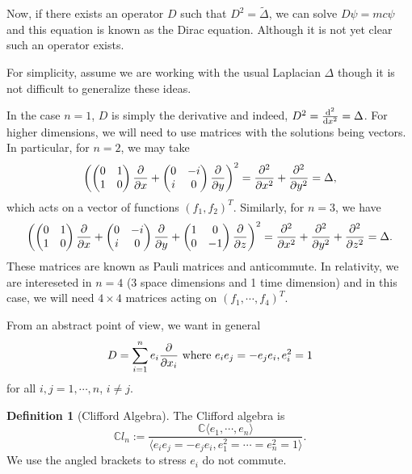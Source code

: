 \documentclass[]{article}
\theoremstyle{definition}
\theoremstyle{definition}
\newtheorem{definition}{Definition}[section]
\begin{document}
Now, if there exists an operator \(D\) such that \(D^2 = \tilde \Delta\), 
we can solve \(D\psi = mc \psi\) and this equation is known as the Dirac equation.
Although it is not yet clear such an operator exists.

For simplicity, assume we are working with the usual Laplacian \(\Delta\) though 
it is not difficult to generalize these ideas.

In the case \(n = 1\), \(D\) is simply the derivative and indeed, 
\(D^2 = \dv[2]{x} = \Delta\). For higher dimensions, we will need to use matrices 
with the solutions being vectors. In particular, for \(n = 2\), we may take 
\[\left(
  \begin{pmatrix}
    0 & 1 \\
    1 & 0
  \end{pmatrix}
  \pdv{x} +
  \begin{pmatrix}
    0 & -i \\
    i & 0
  \end{pmatrix}
  \pdv{y}
\right)^2 = 
  \pdv[2]{x} + \pdv[2]{y} = \Delta,\]
which acts on a vector of functions \((f_1, f_2)^T\). Similarly, 
for \(n = 3\), we have 
\[\left(
  \begin{pmatrix}
    0 & 1 \\
    1 & 0
  \end{pmatrix}
  \pdv{x} +
  \begin{pmatrix}
    0 & -i \\
    i & 0
  \end{pmatrix}
  \pdv{y} + 
  \begin{pmatrix}
    1 & 0 \\
    0 & -1
  \end{pmatrix}
  \pdv{z}
\right)^2 = 
  \pdv[2]{x} + \pdv[2]{y} + \pdv[2]{z} = \Delta.\]
These matrices are known as Pauli matrices and anticommute. In relativity, 
we are intereseted in \(n = 4\) (3 space dimensions and 1 time dimension) 
and in this case, we will need \(4 \times 4\) matrices acting on 
\((f_1, \cdots, f_4)^T\).

From an abstract point of view, we want in general 
\[D = \sum_{i = 1}^n e_i \pdv{x_i} \text{ where } e_i e_j = -e_je_i, e_i^2 = 1\]
for all \(i, j = 1, \cdots, n\), \(i \neq j\).

\begin{definition}[Clifford Algebra]
  The Clifford algebra is 
  \[\mathbb{C}l_n := \frac{\mathbb{C}\langle e_1, \cdots, e_n \rangle}{
    \langle e_i e_j = -e_j e_i, e_1^2 = \cdots = e_n^2 = 1 \rangle}.\]
  We use the angled brackets to stress \(e_i\) do not commute.
\end{definition}
\end{document}
